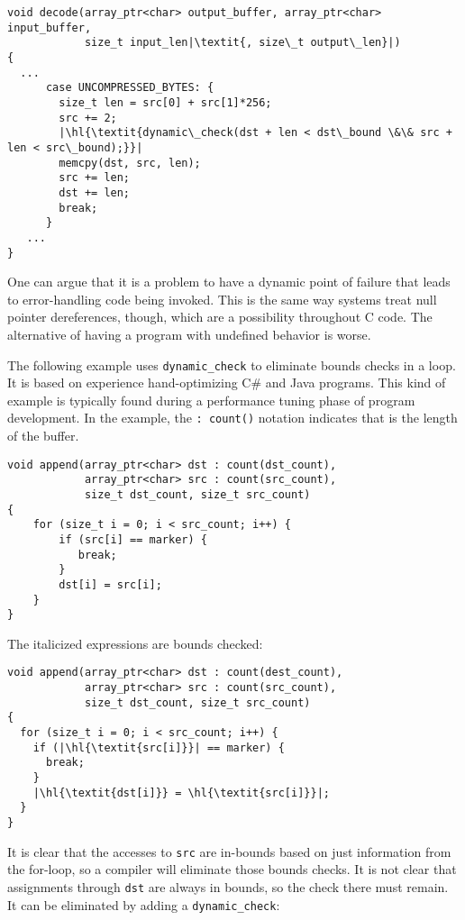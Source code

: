 \begin{lstlisting}[escapechar=\|]
void decode(array_ptr<char> output_buffer, array_ptr<char> input_buffer,
            size_t input_len|\textit{, size\_t output\_len}|)
{
  ...
      case UNCOMPRESSED_BYTES: {
        size_t len = src[0] + src[1]*256;
        src += 2;
        |\hl{\textit{dynamic\_check(dst + len < dst\_bound \&\& src + len < src\_bound);}}|
        memcpy(dst, src, len);
        src += len;
        dst += len;
        break;
      }
   ...
}
\end{lstlisting}

One can argue that it is a problem to have a dynamic point of failure
that leads to error-handling code being invoked. This is the same way
systems treat null pointer dereferences, though, which are a possibility
throughout C code. The alternative of having a program with undefined
behavior is worse.

The following example uses \lstinline+dynamic_check+ to eliminate bounds
checks in a loop. It is based on experience hand-optimizing C\# and Java
programs. This kind of example is typically found during a performance
tuning phase of program development. In the example,
the \lstinline|: count(|\lstinline|)| notation indicates that  is the
length of the buffer.

\begin{lstlisting}
void append(array_ptr<char> dst : count(dst_count),
            array_ptr<char> src : count(src_count),
            size_t dst_count, size_t src_count)
{
    for (size_t i = 0; i < src_count; i++) {
        if (src[i] == marker) {
           break;
        }
        dst[i] = src[i];
    }
}
\end{lstlisting}

The italicized expressions are bounds checked:
\begin{lstlisting}[escapechar=\|]
void append(array_ptr<char> dst : count(dest_count),
            array_ptr<char> src : count(src_count),
            size_t dst_count, size_t src_count)
{
  for (size_t i = 0; i < src_count; i++) {
    if (|\hl{\textit{src[i]}}| == marker) {
      break;
    }
    |\hl{\textit{dst[i]}} = \hl{\textit{src[i]}}|;
  }
}
\end{lstlisting}

It is clear that the accesses to \lstinline+src+ are in-bounds based on
just information from the for-loop, so a compiler will eliminate those
bounds checks. It is not clear that assignments through \lstinline+dst+ are
always in bounds, so the check there must remain. It can be eliminated
by adding a \lstinline+dynamic_check+:


